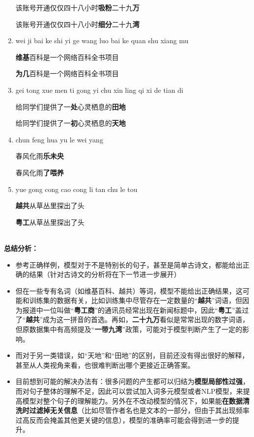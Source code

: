 \documentclass{article}
\begin{document}
\begin{spacing}{1.1}
\begin{enumerate}
	该账号开通仅仅四十八小时\textbf{吸粉}二十九\textbf{万}
	
	该账号开通仅仅四十八小时\textbf{细分}二十九\textbf{湾}
	\item wei ji bai ke shi yi ge wang luo bai ke quan shu xiang mu
	
	\textbf{维基}百科是一个网络百科全书项目
	
	\textbf{为几}百科是一个网络百科全书项目
	\item gei tong xue men ti gong yi chu xin ling qi xi de tian di
	
	给同学们提供了一\textbf{处}心灵栖息的\textbf{田地}
	
	给同学们提供了一\textbf{初}心灵栖息的\textbf{天地}
	\item chun feng hua yu le wei yang
	
	春风化雨\textbf{乐未央}
	
	春风化雨\textbf{了喂养}
	\item yue gong cong cao cong li tan chu le tou
	
	\textbf{越共}从草丛里探出了头
	
	\textbf{粤工}从草丛里探出了头

\end{enumerate}
\ \\\textbf{总结分析：}
\hspace{1.4em}
\begin{itemize}
	\item 参考正确样例，模型对于不是特别长的句子，甚至是简单古诗文，都能给出正确的结果（针对古诗文的分析将在下一节进一步展开）
	\item 但在一些专有名词（如维基百科、越共）等词，模型不能给出正确结果，这可能和训练集的数据有关，比如训练集中尽管存在一定数量的“\textbf{越共}”词语，但因为报道中一位叫做“\textbf{粤工商}”的通讯员经常出现在新闻标题中，因此“\textbf{粤工}”盖过了“\textbf{越共}”成为这一拼音的首选。再如，\textbf{二十九万}看似是常常出现的数字词语，但原数据集中有高频提及“\textbf{一带九湾}”政策，可能对于模型判断产生了一定的影响。
	\item 而对于另一类错误，如“天地”和“田地”的区别，目前还没有得出很好的解释，甚至从人类视角来看，也很难判断出哪个更接近正确答案。
	\item 目前想到可能的解决办法有：很多问题的产生都可以归结为\textbf{模型局部性过强}，而对句子整体的理解不足，因此可以尝试加入词多元模型或者NLP模型，来提高模型对整个句子的理解能力。另外在不改动模型的情况下，如果能\textbf{在数据清洗时过滤掉无关信息}（比如尽管作者名也是文本的一部分，但由于其出现频率过高反而会掩盖其他更关键的信息），模型的准确率可能会得到进一步的提升。
	

\end{itemize}
\end{spacing}
\end{document}
